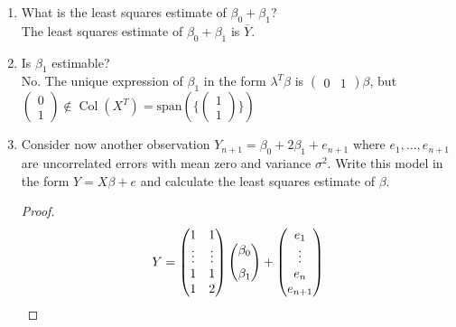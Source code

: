 \documentclass[12pt]{article}
\DeclareMathOperator*{\Col}{Col}
\begin{document}
\begin{enumerate}[leftmargin=0cm,itemindent=.5cm,labelwidth=\itemindent,labelsep=0cm,align=left]
\begin{enumerate}
\begin{proof}
\noindent Therefore, the solution set for the normal equations is $\{ (\hat{\beta_0}, \hat{\beta_1}) : \hat{\beta_0} + \hat{\beta_1} = \overline{Y} \}$.  One solution is $\hat{\beta} = (\overline{Y}, 0)$.  However, this solution is not unique.

\end{proof}

\item What is the least squares estimate of $\beta_0 + \beta_1$? \\
The least squares estimate of $\beta_0 + \beta_1$ is $\overline{Y}$.
\item Is $\beta_1$ estimable? \\
No.  The unique expression of $\beta_1$ in the form $\lambda^T \beta$ is $\begin{pmatrix}
0 & 1
\end{pmatrix}
\beta$, but $\begin{pmatrix}
0 \\
1
\end{pmatrix} \not \in \Col(X^T) = \text{span}\left(\{ \begin{pmatrix}
1 \\
1
\end{pmatrix} \} \right)$
\item Consider now another observation $Y_{n+1} = \beta_0 + 2\beta_1 + e_{n+1}$ where $e_1, \dots, e_{n+1}$ are uncorrelated errors with mean zero and variance $\sigma^2$.  Write this model in the form $Y = X\beta + e$ and calculate the least squares estimate of $\beta$.

\begin{proof}

$$Y = \begin{pmatrix}
1 & 1 \\ 
\vdots & \vdots \\ 
1 & 1 \\ 
1 & 2
\end{pmatrix}
\begin{pmatrix}
\beta_0 \\ 
\beta_1 \vphantom{\vdots}
\end{pmatrix}
+ 
\begin{pmatrix}
e_1 \\
\vdots \\
e_n \\
e_{n+1}
\end{pmatrix}
$$



\end{proof}
\end{enumerate}
\end{enumerate}
\end{document}
